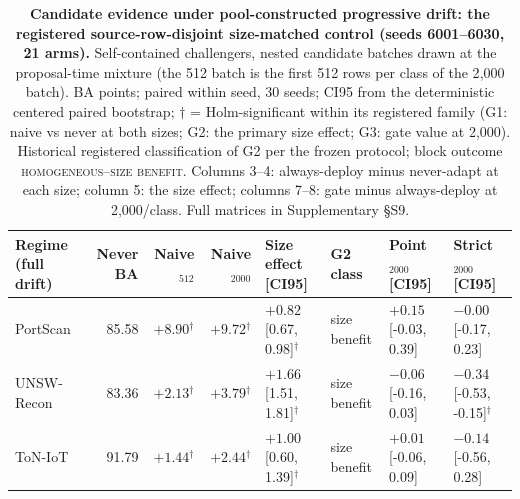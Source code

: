 \begin{table}[t]
\centering
\caption{\textbf{Candidate evidence under pool-constructed progressive drift: the registered
source-row-disjoint size-matched control (seeds 6001--6030, 21 arms).} Self-contained challengers, nested
candidate batches drawn at the proposal-time mixture (the 512 batch is the first 512 rows
per class of the 2{,}000 batch). BA points; paired within seed, 30 seeds; CI95 from the
deterministic centered paired bootstrap; $\dagger$ = Holm-significant within its registered
family (G1: naive vs never at both sizes; G2: the primary size effect; G3: gate value at
2{,}000). Historical registered classification of G2 per the frozen protocol; block outcome
\textsc{homogeneous--size benefit}. Columns 3--4: always-deploy
minus never-adapt at each size; column 5: the size effect; columns 7--8: gate minus
always-deploy at 2{,}000/class. Full matrices in Supplementary \S S9.}
\label{tab:size_matched_drift}
\footnotesize
\setlength{\tabcolsep}{3pt}
\begin{tabular}{l r r r l l l l}
\toprule
Regime (full drift) & Never BA & Naive$_{512}$ & Naive$_{2000}$ &
Size effect [CI95] & G2 class & Point$_{2000}$ [CI95] & Strict$_{2000}$ [CI95] \\
\midrule
PortScan & 85.58 & $+8.90$$^{\dagger}$ & $+9.72$$^{\dagger}$ & $+0.82$ [0.67, 0.98]$^{\dagger}$ & size benefit & $+0.15$ [-0.03, 0.39] & $-0.00$ [-0.17, 0.23] \\
UNSW-Recon & 83.36 & $+2.13$$^{\dagger}$ & $+3.79$$^{\dagger}$ & $+1.66$ [1.51, 1.81]$^{\dagger}$ & size benefit & $-0.06$ [-0.16, 0.03] & $-0.34$ [-0.53, -0.15]$^{\dagger}$ \\
ToN-IoT & 91.79 & $+1.44$$^{\dagger}$ & $+2.44$$^{\dagger}$ & $+1.00$ [0.60, 1.39]$^{\dagger}$ & size benefit & $+0.01$ [-0.06, 0.09] & $-0.14$ [-0.56, 0.28] \\
\bottomrule
\end{tabular}
\end{table}
